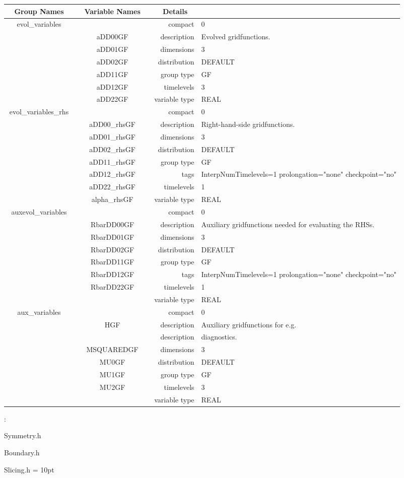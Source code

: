 \begin{tabular*}{150mm}{|c|c@{\extracolsep{\fill}}|rl|} \hline 
~ {\bf Group Names} ~ & ~ {\bf Variable Names} ~  &{\bf Details} ~ & ~\\ 
\hline 
evol\_variables &  & compact & 0 \\ 
 & aDD00GF & description & Evolved gridfunctions. \\ 
 & aDD01GF & dimensions & 3 \\ 
 & aDD02GF & distribution & DEFAULT \\ 
 & aDD11GF & group type & GF \\ 
 & aDD12GF & timelevels & 3 \\ 
 & aDD22GF & variable type & REAL \\ 
\hline 
evol\_variables\_rhs &  & compact & 0 \\ 
 & aDD00\_rhsGF & description & Right-hand-side gridfunctions. \\ 
 & aDD01\_rhsGF & dimensions & 3 \\ 
 & aDD02\_rhsGF & distribution & DEFAULT \\ 
 & aDD11\_rhsGF & group type & GF \\ 
 & aDD12\_rhsGF & tags & InterpNumTimelevels=1 prolongation="none" checkpoint="no" \\ 
 & aDD22\_rhsGF & timelevels & 1 \\ 
 & alpha\_rhsGF & variable type & REAL \\ 
\hline 
auxevol\_variables &  & compact & 0 \\ 
 & RbarDD00GF & description & Auxiliary gridfunctions needed for evaluating the RHSs. \\ 
 & RbarDD01GF & dimensions & 3 \\ 
 & RbarDD02GF & distribution & DEFAULT \\ 
 & RbarDD11GF & group type & GF \\ 
 & RbarDD12GF & tags & InterpNumTimelevels=1 prolongation="none" checkpoint="no" \\ 
 & RbarDD22GF & timelevels & 1 \\ 
 &  & variable type & REAL \\ 
\hline 
aux\_variables &  & compact & 0 \\ 
 & HGF & description & Auxiliary gridfunctions for e.g. \\ 
& ~ & description &  diagnostics. \\ 
 & MSQUAREDGF & dimensions & 3 \\ 
 & MU0GF & distribution & DEFAULT \\ 
 & MU1GF & group type & GF \\ 
 & MU2GF & timelevels & 3 \\ 
 &  & variable type & REAL \\ 
\hline 
\end{tabular*} 



\vspace{5mm}

: 

Symmetry.h

Boundary.h

Slicing.h
\vspace{2mm}\parskip = 10pt 
